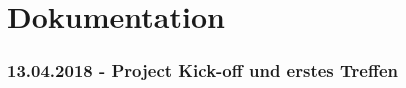 \part{Dokumentation}\label{sec:documentation}

\section{13.04.2018 - Project Kick-off und erstes Treffen}


\newpage